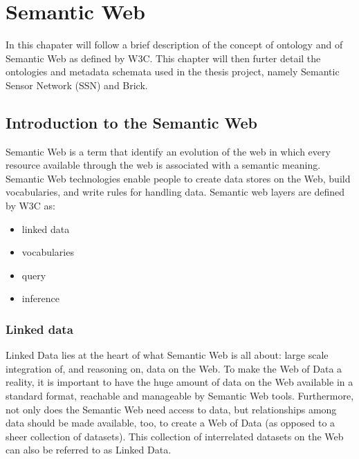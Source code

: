 \chapter{Semantic Web}
\label{ch:semantic_web}
\nocite{rdf_introduction}
\onehalfspace
In this chapater will follow a brief description of the concept of ontology and of Semantic Web as defined by W3C. This chapter will then furter detail the ontologies and metadata schemata used in the thesis project, namely Semantic Sensor Network (SSN) and Brick.

\section{Introduction to the Semantic Web}
Semantic Web is a term that identify an evolution of the web in which every resource available through the web is associated with a semantic meaning. Semantic Web technologies enable people to create data stores on the Web, build vocabularies, and write rules for handling data.
Semantic web layers are defined by W3C as:
\begin{itemize}
  \item linked data
  \item vocabularies
  \item query
  \item inference
\end{itemize}

\subsection{Linked data}
Linked Data lies at the heart of what Semantic Web is all about: large scale integration of, and reasoning on, data on the Web. To make the Web of Data a reality, it is important to have the huge amount of data on the Web available in a standard format, reachable and manageable by Semantic Web tools. Furthermore, not only does the Semantic Web need access to data, but relationships among data should be made available, too, to create a Web of Data (as opposed to a sheer collection of datasets). This collection of interrelated datasets on the Web can also be referred to as Linked Data.

